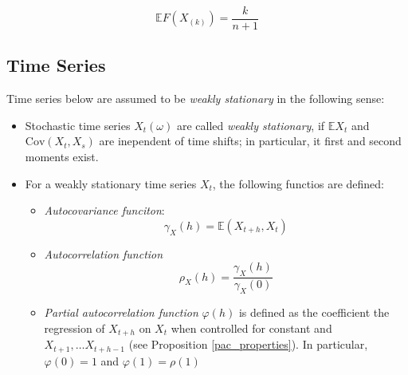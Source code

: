 \documentclass[12pt]{article}
\theoremstyle{definition}
\theoremstyle{remark}
\numberwithin{equation}{section}
\newcommand{\EE}{\mathbb{E}}
\begin{document}
\begin{equation}\label{kth_order_expectation}
	\mathbb{E}F(X_{(k)}) = \frac k{n+1}
\end{equation}

\subsection{Time Series}

Time series below are assumed to be \emph{weakly stationary} in the following sense:

\begin{itemize}
	\item Stochastic time series $X_t(\omega)$ are called \emph{weakly stationary}, if $\EE X_t$ and $\text{Cov}(X_t, X_s)$ are inependent of time shifts; in particular, it first and second moments exist.
	\item For a weakly stationary time series $X_t$, the following functios are defined:
	\begin{itemize}
		\item\emph{Autocovariance funciton}:
		\begin{equation}
			\gamma_X(h) = \EE(X_{t+h}, X_t)
		\end{equation}
		\item \emph{Autocorrelation function}
		\begin{equation}
			\rho_X(h) = \frac {\gamma_X(h)}{\gamma_X(0)}
		\end{equation}
		\item \emph{Partial autocorrelation function} $\varphi(h)$ is defined as the coefficient the regression of $X_{t+h}$ on $X_t$ when controlled for constant and $X_{t+1}, \ldots X_{t+h-1}$ (see Proposition \ref{pac_properties}). In particular, $\varphi(0) = 1$ and $\varphi(1) = \rho(1)$
	\end{itemize}

\end{itemize}
\end{document}
